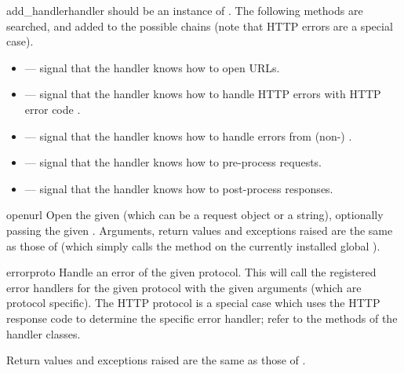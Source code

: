 \begin{methoddesc}[OpenerDirector]{add_handler}{handler}
 should be an instance of .  The
following methods are searched, and added to the possible chains (note
that HTTP errors are a special case).

\begin{itemize}
  \item {} ---
    signal that the handler knows how to open  URLs.
  \item {} ---
    signal that the handler knows how to handle HTTP errors with HTTP
    error code .
  \item {} ---
    signal that the handler knows how to handle errors from
    (non-) .
  \item {} ---
    signal that the handler knows how to pre-process 
    requests.
  \item {} ---
    signal that the handler knows how to post-process 
    responses.
\end{itemize}
\end{methoddesc}

\begin{methoddesc}[OpenerDirector]{open}{url}
Open the given  (which can be a request object or a string),
optionally passing the given .
Arguments, return values and exceptions raised are the same as those
of  (which simply calls the  method
on the currently installed global ).
\end{methoddesc}

\begin{methoddesc}[OpenerDirector]{error}{proto}
Handle an error of the given protocol.  This will call the registered
error handlers for the given protocol with the given arguments (which
are protocol specific).  The HTTP protocol is a special case which
uses the HTTP response code to determine the specific error handler;
refer to the  methods of the handler classes.

Return values and exceptions raised are the same as those
of .
\end{methoddesc}

